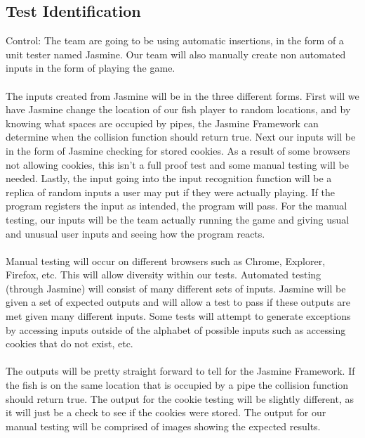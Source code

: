 \documentclass[11pt, oneside]{article}   	%
\begin{document}
\subsection{Test Identification}
Control: The team are going to be using automatic insertions, in the form of a unit tester named Jasmine. Our team will also manually create non automated inputs in the form of playing the game.\\
\\
The inputs created from Jasmine will be in the three different forms. First will we have Jasmine change the location of our fish player to random locations, and by knowing what spaces are occupied by pipes, the Jasmine Framework can determine when the collision function should return true. Next our inputs will be in the form of Jasmine checking for stored cookies. As a result of some browsers not allowing cookies, this isn't a full proof test and some manual testing will be needed. Lastly, the input going into the input recognition function will be a replica of random inputs a user may put if they were actually playing. If the program registers the input as intended, the program will pass. For the manual testing, our inputs will be the team actually running the game and giving usual and unusual user inputs and seeing how the program reacts.\\
 \\
Manual testing will occur on different browsers such as Chrome, Explorer, Firefox, etc. This will allow diversity within our tests. Automated testing (through Jasmine) will consist of many different sets of inputs. Jasmine will be given a set of expected outputs and will allow a test to pass if these outputs are met given many different inputs. Some tests will attempt to generate exceptions by accessing inputs outside of the alphabet of possible inputs such as accessing cookies that do not exist, etc.\\
\\
The outputs will be pretty straight forward to tell for the Jasmine Framework. If the fish is on the same location that is occupied by a pipe the collision function should return true. The output for the cookie testing will be slightly different, as it will just be a check to see if the cookies were stored. The output for our manual testing will be comprised of images showing the expected results. 
\end{document}
